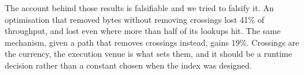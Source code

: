 \documentclass[sigconf,nonacm]{acmart}
\begin{document}
The account behind those results is falsifiable and we tried to falsify it. An
optimisation that removed bytes without removing crossings lost 41\% of
throughput, and lost even where more than half of its lookups hit. The same
mechanism, given a path that removes crossings instead, gains 19\%. Crossings are
the currency, the execution venue is what sets them, and it should be a runtime
decision rather than a constant chosen when the index was designed.

\balance
\end{document}

